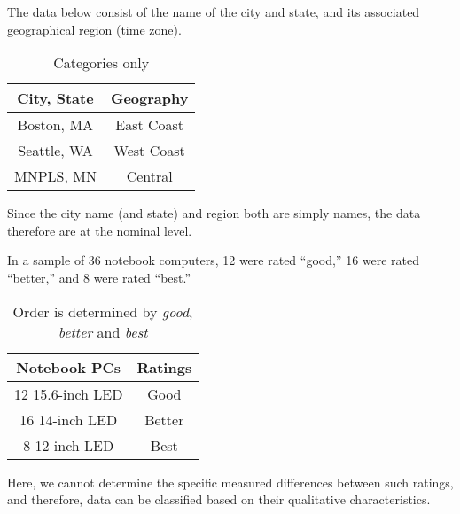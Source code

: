 \begin{example} [Nominal]  
The data below consist of the name of the city and state, and its associated geographical region (time zone). 
\begin{table}[h]
   \centering 
   \caption{ \label{tab:nominal} Categories only}
   \begin{tabular}{|c|c|}
   \hline
      {\bf{City, State}} & {\bf{Geography}} \\
   \hline
   Boston, MA & East Coast  \\
   \hline
   Seattle, WA & West Coast  \\
   \hline
   MNPLS, MN & Central \\
   \hline
   \end{tabular}
\end{table}

Since the city name (and state) and region both are simply names, the data therefore are at the nominal level.
\end{example} 

\begin{example} [Ordinal] 
In a sample of 36 notebook computers, 12 were rated ``good,'' 16 were rated ``better,'' and 8 were rated ``best.''
\begin{table}[h]
\centering 
\caption{ \label{tab:ordinal} Order is determined by {\it{good}}, {\it{better}} and {\it{best}}}
\begin{tabular}{|c|c|}
\hline
{\bf Notebook PCs} & {\bf Ratings} \\
\hline
12 15.6-inch LED & Good  \\
\hline
16 14-inch LED & Better  \\
\hline
8 12-inch LED & Best \\
\hline
\end{tabular}
\end{table}

Here, we cannot determine the specific measured differences between such ratings, and therefore, data can be classified based on their qualitative characteristics.
\end{example} 

